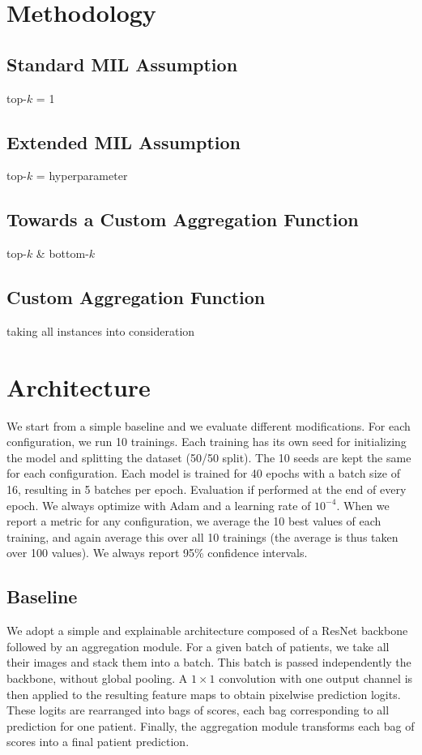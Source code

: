 \documentclass[final]{cvpr}
\begin{document}
	\section{Methodology}
	
	\subsection{Standard MIL Assumption} 
	
	top-$k$ = 1

	\subsection{Extended  MIL Assumption} 
	
	top-$k$ = hyperparameter

	\subsection{Towards a Custom Aggregation Function}
	
	top-$k$ \& bottom-$k$
	
	\subsection{Custom Aggregation Function}
	
	taking all instances into consideration
	
	\section{Architecture}
	
	We start from a simple baseline and we evaluate different modifications.
	For each configuration, we run 10 trainings. Each training has its own seed for initializing the model and splitting the dataset (50/50 split). The 10 seeds are kept the same for each configuration. Each model is trained for 40 epochs with a batch size of 16, resulting in 5 batches per epoch. Evaluation if performed at the end of every epoch. We always optimize with Adam and a learning rate of $10^{-4}$. When we report a metric for any configuration, we average the 10 best values of each training, and again average this over all 10 trainings (the average is thus taken over 100 values). We always report 95\% confidence intervals.
	
	\subsection{Baseline}
	We adopt a simple and explainable architecture composed of a ResNet \cite{resnet} backbone followed by an aggregation module.
	For a given batch of patients, we take all their images and stack them into a batch.
	This batch is passed independently the backbone, without global pooling. 
	A $1\times 1$ convolution with one output channel is then applied to the resulting feature maps to obtain pixelwise prediction logits.
	These logits are rearranged into bags of scores, each bag corresponding to all  prediction for one patient.
	Finally, the aggregation module transforms each bag of scores into a final patient prediction.
	
\end{document}
